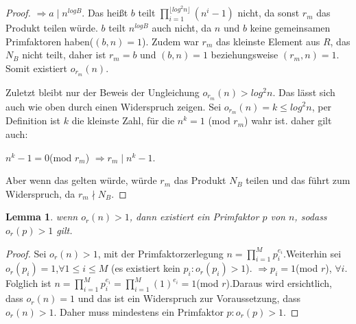 \documentclass[12pt,oneside]{article}
\newtheorem{lemma}[theorem]{Lemma}
\theoremstyle{remark}
\theoremstyle{definition}
\begin{document}
\begin{proof}
$\Rightarrow a \mid n^{log B}$.\newline\newline
Das heißt $b$ teilt $\prod_{i = 1}^{\lfloor log^2 n \rfloor}(n^i - 1)$ nicht, da sonst $r_{m}$ das Produkt teilen würde. $b$ teilt $n^{log B}$ auch nicht, da $n$ und $b$ keine gemeinsamen Primfaktoren haben($(b,n) = 1$). Zudem war $r_{m}$ das kleinste Element aus $R$, das $N_{B}$ nicht teilt, daher ist $r_{m}= b$ und $(b,n) = 1$ beziehungsweise $(r_{m},n) = 1$. Somit existiert $o_{r_{m}}(n)$.\newline\newline

Zuletzt bleibt nur der Beweis der Ungleichung $o_{r_{m}}(n) > log^2 n$. Das lässt sich auch wie oben durch einen Widerspruch zeigen. Sei $o_{r_{m}}(n) = k \leq log^2 n$, per Definition ist $k$ die kleinste Zahl, für die $n^k = 1$ (mod $r_{m}$) wahr ist. daher gilt auch:\newline\newline
\centerline{$n^k - 1 = 0 $(mod  $r_{m}$) $\Rightarrow r_{m} \mid n^k - 1$.}

Aber wenn das gelten würde, würde $r_{m}$ das Produkt $N_{B}$ teilen und das führt zum Widerspruch, da $r_{m} \nmid N_{B}$. 
\end{proof}

\smallskip

\begin{lemma}\label{ord_prime_l}
wenn $o_{r}(n) > 1$, dann existiert ein Primfaktor $p$ von $n$, sodass $o_{r}(p) > 1$ gilt. 
\end{lemma}
\begin{proof}
Sei $o_{r}(n) > 1$, mit der Primfaktorzerlegung $n = \prod_{i = 1}^{M} p_{i}^{e_{i}}$.\newline\newline Weiterhin sei $o_{r}(p_{i}) = 1$,$\forall 1 \leq i \leq M$ (es existiert kein $p_{i} : o_{r}(p_{i}) > 1$).\newline\newline
$\Rightarrow p_{i} = 1 $(mod $r$), $\forall i$. Folglich ist $n = \prod_{i = 1} ^{M} p_{i}^{e_{i}} = \prod_{i = 1} ^{M}(1)^{e_{i}} = 1 $(mod $r$).\newline\newline Daraus wird ersichtlich, dass $o_{r}(n) = 1$ und das ist ein Widerspruch zur Voraussetzung, dass $o_{r}(n) > 1$. Daher muss mindestens ein Primfaktor $p : o_{r}(p) > 1$.  
\end{proof}

\smallskip
\end{document}
